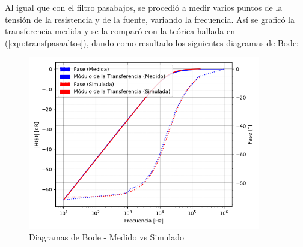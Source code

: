 \documentclass[11pt, a4paper]{article}
\begin{document}
Al igual que con el filtro pasabajos, se procedió a medir varios puntos de la tensión de la resistencia y de la fuente, variando la frecuencia. Así se graficó la transferencia medida y se la comparó con la teórica hallada en (\ref{equ:transfpasaaltos}), dando como resultado los siguientes diagramas de Bode:

\begin{figure}[H]
	\centering
	\includegraphics[width=0.9\textwidth]{Bode_filtro_pasaalto.png}
	\caption{Diagramas de Bode - Medido vs Simulado} 
	\label{graf:bodes_pasaalto}
\end{figure}
\end{document}
